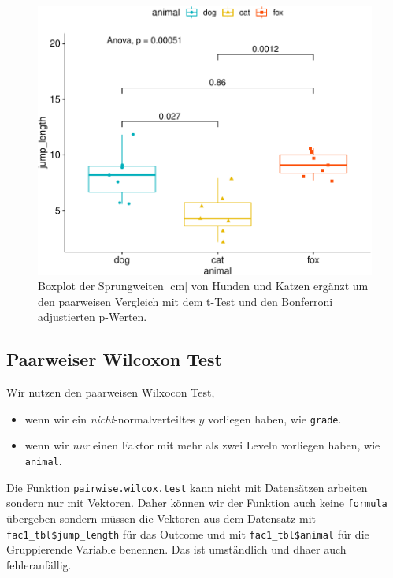 \documentclass[
  letterpaper,
]{scrbook}
\providecommand{\tightlist}{%
  \setlength{\itemsep}{0pt}\setlength{\parskip}{0pt}}\usepackage{longtable,booktabs,array}
\begin{document}
\begin{figure}[H]

{\centering \includegraphics{./stat-tests-posthoc_files/figure-pdf/fig-ggpubr-1-1.pdf}

}

\caption{\label{fig-ggpubr-1}Boxplot der Sprungweiten {[}cm{]} von
Hunden und Katzen ergänzt um den paarweisen Vergleich mit dem t-Test und
den Bonferroni adjustierten p-Werten.}

\end{figure}

\hypertarget{paarweiser-wilcoxon-test}{%
\subsection{Paarweiser Wilcoxon Test}\label{paarweiser-wilcoxon-test}}

Wir nutzen den paarweisen Wilxocon Test,

\begin{itemize}
\tightlist
\item
  wenn wir ein \emph{nicht}-normalverteiltes \(y\) vorliegen haben, wie
  \texttt{grade}.
\item
  wenn wir \emph{nur} einen Faktor mit mehr als zwei Leveln vorliegen
  haben, wie \texttt{animal}.
\end{itemize}

Die Funktion \texttt{pairwise.wilcox.test} kann nicht mit Datensätzen
arbeiten sondern nur mit Vektoren. Daher können wir der Funktion auch
keine \texttt{formula} übergeben sondern müssen die Vektoren aus dem
Datensatz mit \texttt{fac1\_tbl\$jump\_length} für das Outcome und mit
\texttt{fac1\_tbl\$animal} für die Gruppierende Variable benennen. Das
ist umständlich und dhaer auch fehleranfällig.
\end{document}

